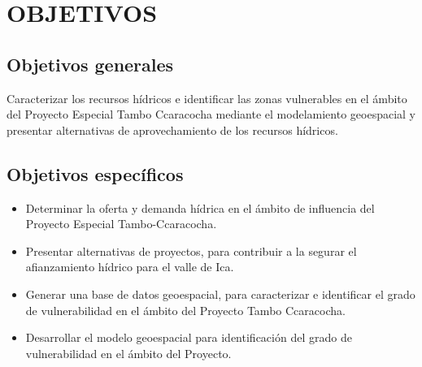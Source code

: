 \chapter{OBJETIVOS}
\thispagestyle{empty}
\section{Objetivos generales}
Caracterizar los recursos hídricos e identificar las zonas vulnerables en el ámbito del Proyecto Especial Tambo Ccaracocha mediante el modelamiento geoespacial y presentar alternativas de aprovechamiento de los recursos hídricos.

\section{Objetivos específicos}
\begin{itemize}
    \item Determinar la oferta y demanda hídrica en el ámbito de influencia del Proyecto Especial Tambo-Ccaracocha. 
    \item Presentar alternativas de proyectos, para contribuir a la segurar el afianzamiento hídrico para el valle de Ica. 
    \item Generar una base de datos geoespacial, para caracterizar e identificar el grado de vulnerabilidad en el ámbito del Proyecto Tambo Ccaracocha.
    \item Desarrollar el modelo geoespacial para identificación del grado de vulnerabilidad en el ámbito del Proyecto. 
\end{itemize}

